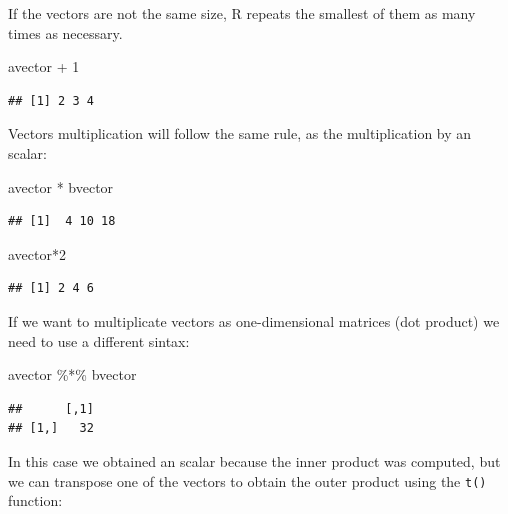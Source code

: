 \documentclass[
]{book}
\newenvironment{Shaded}{\begin{snugshade}}{\end{snugshade}}
\newcommand{\DecValTok}[1]{\textcolor[rgb]{0.00,0.00,0.81}{#1}}
\newcommand{\NormalTok}[1]{#1}
\newcommand{\SpecialCharTok}[1]{\textcolor[rgb]{0.00,0.00,0.00}{#1}}
\theoremstyle{definition}
\theoremstyle{definition}
\theoremstyle{definition}
\theoremstyle{definition}
\theoremstyle{remark}
\begin{document}
If the vectors are not the same size, R repeats the smallest of them as many times as necessary.

\begin{Shaded}
\begin{Highlighting}[]
\NormalTok{avector }\SpecialCharTok{+} \DecValTok{1}
\end{Highlighting}
\end{Shaded}

\begin{verbatim}
## [1] 2 3 4
\end{verbatim}

Vectors multiplication will follow the same rule, as the multiplication by an scalar:

\begin{Shaded}
\begin{Highlighting}[]
\NormalTok{avector }\SpecialCharTok{*}\NormalTok{ bvector}
\end{Highlighting}
\end{Shaded}

\begin{verbatim}
## [1]  4 10 18
\end{verbatim}

\begin{Shaded}
\begin{Highlighting}[]
\NormalTok{avector}\SpecialCharTok{*}\DecValTok{2}
\end{Highlighting}
\end{Shaded}

\begin{verbatim}
## [1] 2 4 6
\end{verbatim}

If we want to multiplicate vectors as one-dimensional matrices (dot product) we need to use a different sintax:

\begin{Shaded}
\begin{Highlighting}[]
\NormalTok{avector }\SpecialCharTok{\%*\%}\NormalTok{ bvector}
\end{Highlighting}
\end{Shaded}

\begin{verbatim}
##      [,1]
## [1,]   32
\end{verbatim}

In this case we obtained an scalar because the inner product was computed, but we can transpose one of the vectors to obtain the outer product using the \texttt{t()} function:
\end{document}
